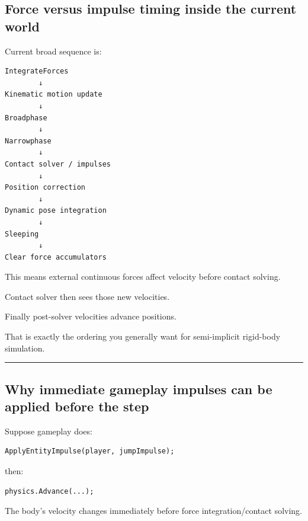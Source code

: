 \subsection{Force versus impulse timing inside the current world}\label{06-engine-ii-ch037-force-versus-impulse-timing-inside-the-current-world}

\hypertarget{06-engine-ii-ch037-force-versus-impulse-timing-inside-the-current-world}{}

Current broad sequence is:

\begin{verbatim}
IntegrateForces
        ↓
Kinematic motion update
        ↓
Broadphase
        ↓
Narrowphase
        ↓
Contact solver / impulses
        ↓
Position correction
        ↓
Dynamic pose integration
        ↓
Sleeping
        ↓
Clear force accumulators
\end{verbatim}

This means external continuous forces affect velocity before contact solving.

Contact solver then sees those new velocities.

Finally post-solver velocities advance positions.

That is exactly the ordering you generally want for semi-implicit rigid-body simulation.

\begin{center}\rule{0.5\linewidth}{0.5pt}\end{center}

\subsection{Why immediate gameplay impulses can be applied before the step}\label{06-engine-ii-ch037-why-immediate-gameplay-impulses-can-be-applied-before-the-step}

\hypertarget{06-engine-ii-ch037-why-immediate-gameplay-impulses-can-be-applied-before-the-step}{}

Suppose gameplay does:

\begin{verbatim}
ApplyEntityImpulse(player, jumpImpulse);
\end{verbatim}

then:

\begin{verbatim}
physics.Advance(...);
\end{verbatim}

The body's velocity changes immediately before force integration/contact solving.

